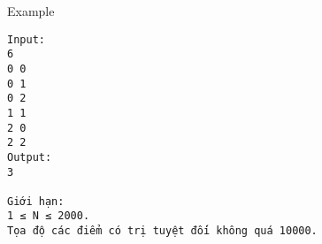 Example
\begin{verbatim}
Input:
6
0 0
0 1
0 2
1 1
2 0
2 2
Output:
3

Giới hạn:
1 ≤ N ≤ 2000.
Tọa độ các điểm có trị tuyệt đối không quá 10000.
\end{verbatim}